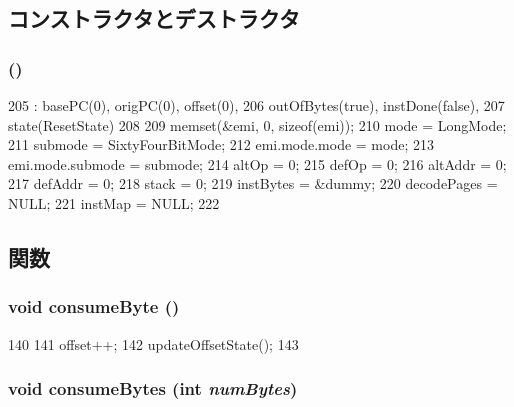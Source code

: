 \subsection{コンストラクタとデストラクタ}
\hypertarget{classX86ISA_1_1Decoder_aedfa2b7d97ed17b14903ed75d6214c78}{
\subsubsection[{Decoder}]{ ()}}
\label{classX86ISA_1_1Decoder_aedfa2b7d97ed17b14903ed75d6214c78}



\begin{DoxyCode}
205               : basePC(0), origPC(0), offset(0),
206         outOfBytes(true), instDone(false),
207         state(ResetState)
208     {
209         memset(&emi, 0, sizeof(emi));
210         mode = LongMode;
211         submode = SixtyFourBitMode;
212         emi.mode.mode = mode;
213         emi.mode.submode = submode;
214         altOp = 0;
215         defOp = 0;
216         altAddr = 0;
217         defAddr = 0;
218         stack = 0;
219         instBytes = &dummy;
220         decodePages = NULL;
221         instMap = NULL;
222     }
\end{DoxyCode}


\subsection{関数}
\hypertarget{classX86ISA_1_1Decoder_ac0b7514336823f27e26271bcad4563a8}{
\subsubsection[{consumeByte}]{\setlength{\rightskip}{0pt plus 5cm}void consumeByte ()}}
\label{classX86ISA_1_1Decoder_ac0b7514336823f27e26271bcad4563a8}



\begin{DoxyCode}
140     {
141         offset++;
142         updateOffsetState();
143     }
\end{DoxyCode}
\hypertarget{classX86ISA_1_1Decoder_a34f1e4d13220afca8ec5c23596daba7e}{
\subsubsection[{consumeBytes}]{\setlength{\rightskip}{0pt plus 5cm}void consumeBytes (int {\em numBytes})}}
\label{classX86ISA_1_1Decoder_a34f1e4d13220afca8ec5c23596daba7e}



